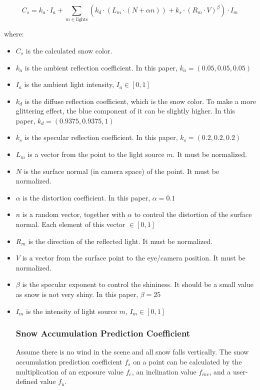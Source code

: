\documentclass{article}
\begin{document}
\[
  C_{s} = k_a \cdot I_a + \sum_{m \in \text{lights}} (k_d \cdot (L_m \cdot (N + \alpha n)) + k_s \cdot (R_m \cdot V)^\beta) \cdot I_m  
\]

where:
\begin{itemize}
  \item \( C_{s} \) is the calculated snow color.
  \item \( k_a \) is the ambient reflection coefficient. In this paper, \( k_a = (0.05, 0.05, 0.05)\)
  \item \( I_a \) is the ambient light intensity, \( I_a \in [0, 1]\)
  \item \( k_d \) is the diffuse reflection coefficient, which is the snow color. To make a more glittering effect, %
  the blue component of it can be slightly higher. In this paper, \( k_d = (0.9375, 0.9375, 1)\)
  \item \( k_s \) is the specular reflection coefficient. In this paper, \( k_s = (0.2, 0.2, 0.2)\)
  \item \( L_m \) is a vector from the point to the light source \( m \). It must be normalized.
  \item \( N \) is the surface normal (in camera space) of the point. It must be normalized.
  \item \( \alpha \) is the distortion coefficient. In this paper, \( \alpha = 0.1\)
  \item \( n \) is a random vector, together with \( \alpha \) to control the distortion of the surface normal. Each 
  element of this vector \(\in [0, 1]\)
  \item \( R_m \) is the direction of the reflected light. It must be normalized.
  \item \( V \) is a vector from the surface point to the eye/camera position. It must be normalized.
  \item \( \beta \) is the specular exponent to control the shininess. It should be a small value as snow is not 
  very shiny. In this paper, \( \beta = 25\)
  \item \( I_m \) is the intensity of light source \( m \), \( I_m \in [0, 1]\)

\subsubsection {Snow Accumulation Prediction Coefficient}
Assume there is no wind in the scene and all snow falls vertically. The snow accumulation prediction coefficient 
\( f_{s} \) on a point can be calculated by the multiplication of an exposure value \( f_{e} \), an inclination 
value \( f_{inc} \), and a user-defined value \( f_{u} \).


\end{itemize}
\end{document}
